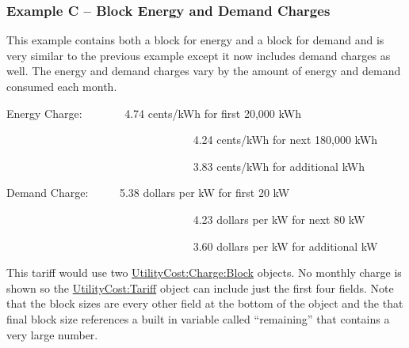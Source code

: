 \subsubsection{Example C -- Block Energy and Demand Charges}\label{example-c-block-energy-and-demand-charges}

This example contains both a block for energy and a block for demand and is very similar to the previous example except it now includes demand charges as well. The energy and demand charges vary by the amount of energy and demand consumed each month.

Energy Charge:~~~~~~~ 4.74 cents/kWh for first 20,000 kWh

~~~~~~~~~~~~~~~~~~~~~~~~~~~~~~~~~ 4.24 cents/kWh for next 180,000 kWh

~~~~~~~~~~~~~~~~~~~~~~~~~~~~~~~~~ 3.83 cents/kWh for additional kWh

Demand Charge:~~~~~ 5.38 dollars per kW for first 20 kW

~~~~~~~~~~~~~~~~~~~~~~~~~~~~~~~~~ 4.23 dollars per kW for next 80 kW

~~~~~~~~~~~~~~~~~~~~~~~~~~~~~~~~~ 3.60 dollars per kW for additional kW

This tariff would use two \hyperref[utilitycostchargeblock]{UtilityCost:Charge:Block} objects. No monthly charge is shown so the \hyperref[utilitycosttariff]{UtilityCost:Tariff} object can include just the first four fields. Note that the block sizes are every other field at the bottom of the object and the that final block size references a built in variable called ``remaining'' that contains a very large number.

